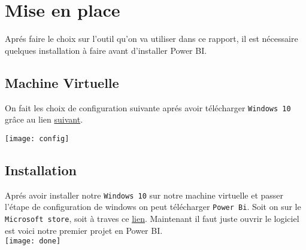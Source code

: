 \documentclass[french,a4paper,11pt,oneside]{book}
\begin{document}
	\section{Mise en place}{
		Aprés faire le choix sur l'outil qu'on va utiliser dans ce rapport, il est nécessaire quelques installation à faire avant d'installer Power BI.\\
			\subsection{Machine Virtuelle}{
				On fait les choix de configuration suivante aprés avoir télécharger \texttt {Windows 10} grâce au lien \href{https://www.microsoft.com/fr-fr/software-download/windows10ISO}{suivant}.
				
				\texttt{[image: config]}
			}
			\subsection{Installation}{
				Aprés avoir installer notre \texttt{Windows 10} sur notre machine virtuelle et passer l'étape de configuration de windows on peut télécharger \texttt{Power Bi}.
				Soit on sur le \texttt{Microsoft store}, soit à traves ce \href{https://www.microsoft.com/fr-fr/download/details.aspx?id=58494}{lien}.
				Maintenant il faut juste ouvrir le logiciel est voici notre premier projet en Power BI.\\
				\texttt{[image: done]}
			}
	}
	\newpage
\end{document}
